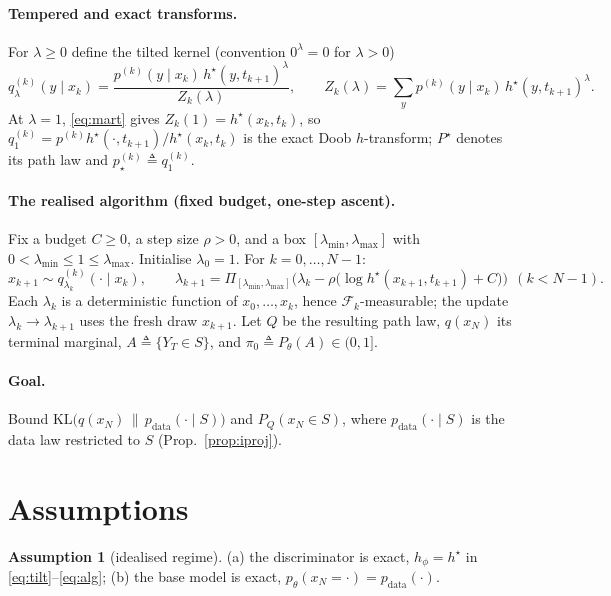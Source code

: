 \documentclass[11pt]{article}
\newcommand{\KL}{\mathrm{KL}}
\newcommand{\F}{\mathcal{F}}
\newcommand{\hs}{h^\star}
\newcommand{\proj}{\Pi}
\newcommand{\lmin}{\lambda_{\min}}
\newcommand{\lmax}{\lambda_{\max}}
\theoremstyle{plain}
\theoremstyle{definition}
\newtheorem{assumption}{Assumption}
\theoremstyle{remark}
\begin{document}
\paragraph{Tempered and exact transforms.} For $\lambda\ge0$ define the tilted
kernel (convention $0^\lambda=0$ for $\lambda>0$)
\begin{equation}
\label{eq:tilt}
q^{(k)}_\lambda(y\mid x_k)=\frac{p^{(k)}(y\mid x_k)\,\hs(y,t_{k+1})^{\lambda}}{Z_k(\lambda)},
\qquad Z_k(\lambda)=\sum_y p^{(k)}(y\mid x_k)\,\hs(y,t_{k+1})^{\lambda}.
\end{equation}
At $\lambda=1$, \eqref{eq:mart} gives $Z_k(1)=\hs(x_k,t_k)$, so
$q^{(k)}_1=p^{(k)}\hs(\cdot,t_{k+1})/\hs(x_k,t_k)$ is the exact Doob
$h$-transform; $P^\star$ denotes its path law and $p^{(k)}_\star\triangleq q^{(k)}_1$.

\paragraph{The realised algorithm (fixed budget, one-step ascent).} Fix a budget
$C\ge0$, a step size $\rho>0$, and a box $[\lmin,\lmax]$ with $0<\lmin\le1\le\lmax$.
Initialise $\lambda_0=1$. For $k=0,\dots,N-1$:
\begin{equation}
\label{eq:alg}
x_{k+1}\sim q^{(k)}_{\lambda_k}(\cdot\mid x_k),\qquad
\lambda_{k+1}=\proj_{[\lmin,\lmax]}\!\Big(\lambda_k-\rho\big(\log\hs(x_{k+1},t_{k+1})+C\big)\Big)\ \ (k<N-1).
\end{equation}
Each $\lambda_k$ is a deterministic function of $x_0,\dots,x_k$, hence
$\F_k$-measurable; the update $\lambda_k\!\to\!\lambda_{k+1}$ uses the fresh draw
$x_{k+1}$. Let $Q$ be the resulting path law, $q(x_N)$ its terminal marginal,
$A\triangleq\{Y_T\in S\}$, and $\pi_0\triangleq P_\theta(A)\in(0,1]$.

\paragraph{Goal.} Bound $\KL\big(q(x_N)\,\|\,p_{\text{data}}(\cdot\mid S)\big)$ and
$P_Q(x_N\in S)$, where $p_{\text{data}}(\cdot\mid S)$ is the data law restricted to
$S$ (Prop.~\ref{prop:iproj}).

\section{Assumptions}
\label{sec:ass}

\begin{assumption}[idealised regime]
\label{as:exact}
\textup{(a)} the discriminator is exact, $h_\phi=\hs$ in \eqref{eq:tilt}--\eqref{eq:alg};
\textup{(b)} the base model is exact, $p_\theta(x_N=\cdot)=p_{\text{data}}(\cdot)$.
\end{assumption}
\end{document}
